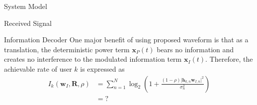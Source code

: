 \documentclass{IEEEtran}
\begin{document}
\begin{section} {System Model}
\begin{subsection}	{Received Signal}
	\end{subsection}

	\begin{subsection}	{Information Decoder}
		One major benefit of using proposed waveform is that as a translation, the deterministic power term $\boldsymbol{x}_P(t)$ bears no information and creates no interference to the modulated information term $\boldsymbol{x}_I(t)$. Therefore, the achievable rate of user $k$ is expressed as
		\begin{equation}	\label{eq:I_k}
			\begin{split}
				I_k(\boldsymbol{w}_I,\boldsymbol{R},\rho)
				&=\sum_{n=1}^N{\log_2\left(1+\frac{(1-\rho)\lvert\boldsymbol{h}_{k,n}\boldsymbol{w}_{I,n}\rvert^2}{\sigma_n^2}\right)}	\\
				&=?
			\end{split}
		\end{equation}

	\end{subsection}

\end{section}



\end{document}
